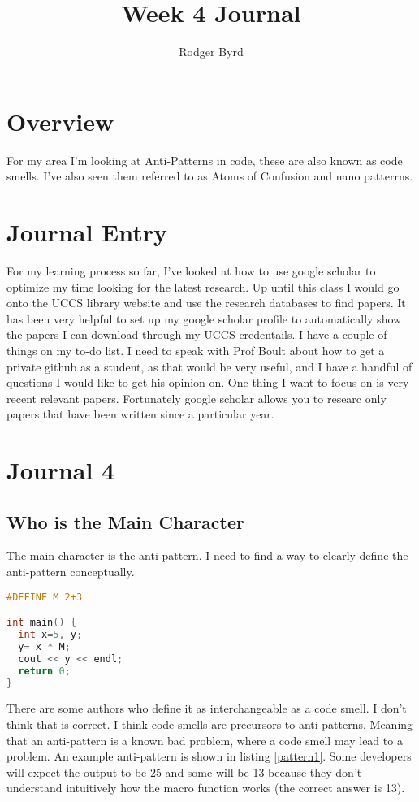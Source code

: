 \documentclass[conference]{IEEEtran}
\begin{document}

\title{Week 4 Journal}
\author{Rodger Byrd}
\maketitle


\section{Overview}
For my area I'm looking at Anti-Patterns in code, these are also known as code smells. I've also seen them referred to as Atoms of Confusion and nano patterrns.

\section{Journal Entry}
For my learning process so far, I've looked at how to use google scholar to optimize my time looking for the latest research.
Up until this class I would go onto the UCCS library website and use the research databases to find papers. 
It has been very helpful to set up my google scholar profile to automatically show the papers I can download through my UCCS credentails.
I have a couple of things on my to-do list.
I need to speak with Prof Boult about how to get a private github as a student, as that would be very useful, and I have a handful of questions I would like to get his opinion on. 
One thing I want to focus on is very recent relevant papers.
Fortunately google scholar allows you to researc only papers that have been written since a particular year.

\section{Journal 4}
\subsection{Who is the Main Character}
The main character is the anti-pattern. I need to find a way to clearly define the anti-pattern conceptually. 

\begin{lstlisting}[language=C,frame=single,caption=Example Anti-Pattern,label=pattern1]
#DEFINE M 2+3

int main() {
  int x=5, y;
  y= x * M;
  cout << y << endl;
  return 0;
}
\end{lstlisting}

There are some authors who define it as interchangeable as a code smell. 
I don't think that is correct. 
I think code smells are precursors to anti-patterns. 
Meaning that an anti-pattern is a known bad problem, where a code smell may lead to a problem.
An example anti-pattern is shown in listing \ref{pattern1}. Some developers will expect the output to be 25 and some will be 13 because they don't understand intuitively how the macro function works (the correct answer is 13).
\end{document}
